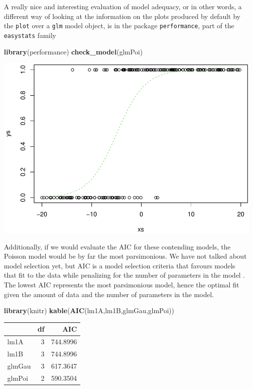 \documentclass[
]{book}
\newenvironment{Shaded}{\begin{snugshade}}{\end{snugshade}}
\newcommand{\FunctionTok}[1]{\textcolor[rgb]{0.13,0.29,0.53}{\textbf{#1}}}
\newcommand{\NormalTok}[1]{#1}
\begin{document}
A really nice and interesting evaluation of model adequacy, or in other words, a different way of looking at the information on the plots produced by default by the \texttt{plot} over a \texttt{glm} model object, is in the package \texttt{performance}, part of the \texttt{easystats} family

\begin{Shaded}
\begin{Highlighting}[]
\FunctionTok{library}\NormalTok{(performance)}
\FunctionTok{check\_model}\NormalTok{(glmPoi)}
\end{Highlighting}
\end{Shaded}

\includegraphics{ECOMODbook_files/figure-latex/unnamed-chunk-31-1.pdf}

Additionally, if we would evaluate the AIC for these contending models, the Poisson model would be by far the most parsimonious. We have not talked about model selection yet, but AIC is a model selection criteria that favours models that fit to the data while penalizing for the number of parameters in the model \citep[e.g.][]{Aho2014}. The lowest AIC represents the most parsimonious model, hence the optimal fit given the amount of data and the number of parameters in the model.

\begin{Shaded}
\begin{Highlighting}[]
\FunctionTok{library}\NormalTok{(knitr)}
\FunctionTok{kable}\NormalTok{(}\FunctionTok{AIC}\NormalTok{(lm1A,lm1B,glmGau,glmPoi))}
\end{Highlighting}
\end{Shaded}

\begin{tabular}{l|r|r}
\hline
  & df & AIC\\
\hline
lm1A & 3 & 744.8996\\
\hline
lm1B & 3 & 744.8996\\
\hline
glmGau & 3 & 617.3647\\
\hline
glmPoi & 2 & 590.3504\\
\hline
\end{tabular}
\end{document}
